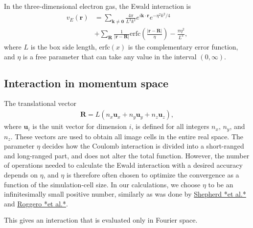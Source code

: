 \documentclass[%
oneside,                 %
final,                   %
10pt]{article}
\begin{document}
In the three-dimensional electron gas, the Ewald 
interaction is 
\begin{align}
  v_{E}(\mathbf{r}) &= \sum_{\mathbf{k} \neq \mathbf{0}}
  \frac{4\pi }{L^{3}k^{2}}e^{i\mathbf{k}\cdot \mathbf{r}}
  e^{-\eta^{2}k^{2}/4} \nonumber \\
  &+ \sum_{\mathbf{R}}\frac{1}{\left| \mathbf{r}
    -\mathbf{R}\right| } \mathrm{erfc} \left( \frac{\left| 
    \mathbf{r}-\mathbf{R}\right|}{\eta }\right)
  - \frac{\pi \eta^{2}}{L^{3}},
\end{align}
where $L$ is the box side length, $\mathrm{erfc}(x)$ is the 
complementary error function, and $\eta $ is a free
parameter that can take any value in the interval 
$(0, \infty )$.



\subsection*{Interaction in momentum space}

The translational vector 
\begin{align}
  \mathbf{R} = L\left(n_{x}\mathbf{u}_{x} + n_{y}
  \mathbf{u}_{y} + n_{z}\mathbf{u}_{z}\right) ,
\end{align}
where $\mathbf{u}_{i}$ is the unit vector for dimension $i$,
is defined for all integers $n_{x}$, $n_{y}$, and 
$n_{z}$. These vectors are used to obtain all image
cells in the entire real space. 
The parameter $\eta $ decides how 
the Coulomb interaction is divided into a short-ranged
and long-ranged part, and does not alter the total
function. However, the number of operations needed
to calculate the Ewald interaction with a desired 
accuracy depends on $\eta $, and $\eta $ is therefore 
often chosen to optimize the convergence as a function
of the simulation-cell size. In
our calculations, we choose $\eta $ to be an infinitesimally
small positive number, similarly as was done by \href{{https://journals.aps.org/prb/abstract/10.1103/PhysRevB.86.035111}}{Shepherd *et al.*} and \href{{https://journals.aps.org/prb/abstract/10.1103/PhysRevB.88.115138}}{Roggero *et al.*}.

This gives an interaction that is evaluated only in
Fourier space. 
\end{document}
